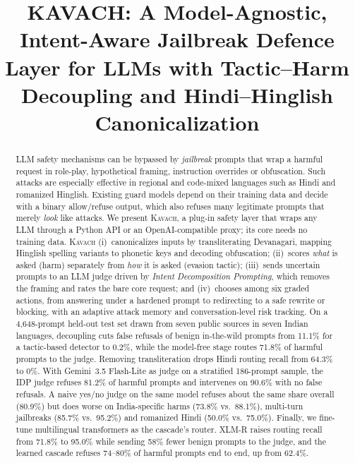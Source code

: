 \documentclass[conference]{IEEEtran}
\newcommand{\pending}[1]{\textcolor{red}{[#1]}}
\begin{document}
\title{KAVACH: A Model-Agnostic, Intent-Aware Jailbreak Defence Layer for LLMs with Tactic--Harm Decoupling and Hindi--Hinglish Canonicalization}

\author{\IEEEauthorblockN{Vaibhavi Das\IEEEauthorrefmark{1} \pending{co-authors / supervisor}}
\IEEEauthorblockA{\IEEEauthorrefmark{1}\pending{Department, Institution, City, India}\\
vaibhavidasv2005@gmail.com}}

\maketitle

\begin{abstract}
LLM safety mechanisms can be bypassed by \emph{jailbreak} prompts that wrap a harmful request in role-play, hypothetical framing, instruction overrides or obfuscation. Such attacks are especially effective in regional and code-mixed languages such as Hindi and romanized Hinglish. Existing guard models depend on their training data and decide with a binary allow/refuse output, which also refuses many legitimate prompts that merely \emph{look} like attacks. We present \textsc{Kavach}, a plug-in safety layer that wraps any LLM through a Python API or an OpenAI-compatible proxy; its core needs no training data. \textsc{Kavach} (i)~canonicalizes inputs by transliterating Devanagari, mapping Hinglish spelling variants to phonetic keys and decoding obfuscation; (ii)~scores \emph{what} is asked (harm) separately from \emph{how} it is asked (evasion tactic); (iii)~sends uncertain prompts to an LLM judge driven by \emph{Intent Decomposition Prompting}, which removes the framing and rates the bare core request; and (iv)~chooses among six graded actions, from answering under a hardened prompt to redirecting to a safe rewrite or blocking, with an adaptive attack memory and conversation-level risk tracking. On a 4{,}648-prompt held-out test set drawn from seven public sources in seven Indian languages, decoupling cuts false refusals of benign in-the-wild prompts from 11.1\% for a tactic-based detector to 0.2\%, while the model-free stage routes 71.8\% of harmful prompts to the judge. Removing transliteration drops Hindi routing recall from 64.3\% to 0\%. With Gemini~3.5 Flash-Lite as judge on a stratified 186-prompt sample, the IDP judge refuses 81.2\% of harmful prompts and intervenes on 90.6\% with no false refusals. A naive yes/no judge on the same model refuses about the same share overall (80.9\%) but does worse on India-specific harms (73.8\% vs.\ 88.1\%), multi-turn jailbreaks (85.7\% vs.\ 95.2\%) and romanized Hindi (50.0\% vs.\ 75.0\%). Finally, we fine-tune multilingual transformers as the cascade's router. XLM-R raises routing recall from 71.8\% to 95.0\% while sending 58\% fewer benign prompts to the judge, and the learned cascade refuses 74--80\% of harmful prompts end to end, up from 62.4\%.
\end{abstract}
\end{document}
